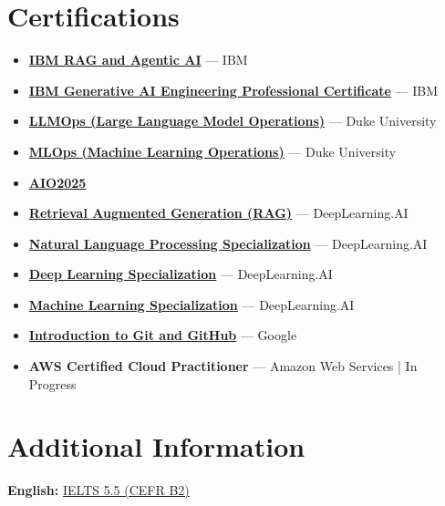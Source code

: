 \documentclass[10pt]{article}
\begin{document}
\section*{Certifications}
{\small
\begin{itemize}[leftmargin=1.3em, itemsep=3pt, topsep=3pt]
    \item \href{https://www.coursera.org/account/accomplishments/specialization/UGL85YAGNCHO}{\textbf{IBM RAG and Agentic AI}} --- IBM
    \item \href{https://www.coursera.org/account/accomplishments/professional-cert/9QBH57NRHTM3}{\textbf{IBM Generative AI Engineering Professional Certificate}} --- IBM
    \item \href{https://www.coursera.org/account/accomplishments/specialization/certificate/IZ9X71QMBET0}{\textbf{LLMOps (Large Language Model Operations)}} --- Duke University
    \item \href{https://www.coursera.org/account/accomplishments/specialization/O2QYWP6V0S5O}{\textbf{MLOps (Machine Learning Operations)}} --- Duke University
    \item \href{https://www.linkedin.com/in/lenhudat-ai-engineer/overlay/Certifications/514705154/treasury/?profileId=ACoAAEpVFlABCefo1x2LT8ZI6SYLtxl8mEtNv40}{\textbf{AIO2025}}
    \item \href{https://www.coursera.org/account/accomplishments/verify/AM4FEL0ESAAL}{\textbf{Retrieval Augmented Generation (RAG)}} --- DeepLearning.AI
    \item \href{https://www.coursera.org/account/accomplishments/specialization/0PGVK2CCTFY0}{\textbf{Natural Language Processing Specialization}} --- DeepLearning.AI
    \item \href{https://www.coursera.org/account/accomplishments/specialization/KJGHQBH7YZ7D}{\textbf{Deep Learning Specialization}} --- DeepLearning.AI
    \item \href{https://www.coursera.org/account/accomplishments/specialization/KAAR2WXDE49V}{\textbf{Machine Learning Specialization}} --- DeepLearning.AI
    \item \href{https://www.coursera.org/account/accomplishments/certificate/J00HYF1KY9DA}{\textbf{Introduction to Git and GitHub}} --- Google
    \item \textbf{AWS Certified Cloud Practitioner} --- Amazon Web Services \;|\; In Progress
\end{itemize}
}

\section*{Additional Information}
{\small
\textbf{English:} \href{https://www.linkedin.com/in/lenhudat-ai-engineer/overlay/Certifications/1973035705/treasury/?profileId=ACoAAEpVFlABCefo1x2LT8ZI6SYLtxl8mEtNv40}{IELTS 5.5 (CEFR B2)}
}
\end{document}
